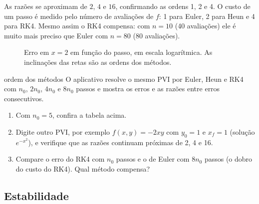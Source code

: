 As razões se aproximam de $2$, $4$ e $16$, confirmando as ordens 1, 2 e 4. O custo de um
passo é medido pelo número de avaliações de $f$: 1 para Euler, 2 para Heun e 4 para RK4.
Mesmo assim o RK4 compensa: com $n=10$ (40 avaliações) ele é muito mais preciso que Euler com
$n=80$ (80 avaliações).

\begin{figure}[h]
\centering
{}
\caption{Erro em $x=2$ em função do passo, em escala logarítmica. As inclinações das retas
são as ordens dos métodos.}
\label{fig:ordem}
\end{figure}

\begin{atividade}{ordem dos métodos}{\arqOrdem}
O aplicativo resolve o mesmo PVI por Euler, Heun e RK4 com $n_0$, $2n_0$, $4n_0$ e $8n_0$
passos e mostra os erros e as razões entre erros consecutivos.
\begin{enumerate}[nosep]
  \item Com $n_0=5$, confira a tabela acima.
  \item Digite outro PVI, por exemplo $f(x,y)=-2xy$ com $y_0=1$ e $x_f=1$ (solução $e^{-x^2}$),
        e verifique que as razões continuam próximas de 2, 4 e 16.
  \item Compare o erro do RK4 com $n_0$ passos e o de Euler com $8n_0$ passos (o dobro do custo
        do RK4). Qual método compensa?
\end{enumerate}
\end{atividade}

\subsection{Estabilidade}

